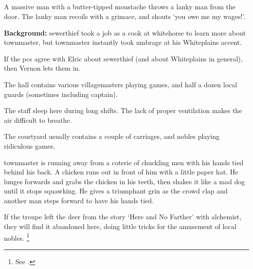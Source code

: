 \subsection{}
\label{whitehorse}

\begin{boxtext}

  A massive man with a butter-tipped moustache throws a lanky man from the door.
  The lanky man recoils with a grimace, and shouts `you owe me my wages!'.

\end{boxtext}

\textbf{Background:}
\Gls{sewerthief} took a job as a cook at \gls{whitehorse} to learn more about \gls{townmaster}, but \gls{townmaster} instantly took umbrage at his Whiteplains accent.

If the \glspl{pc} agree with Elric about \gls{sewerthief} (and about Whiteplains in general), then Vernon lets them in.


The hall contains various villagemasters playing games, and half a dozen local guards (sometimes including \gls{captain}).



The staff sleep here during long shifts.  The lack of proper ventilation makes the air difficult to breathe.


The courtyard usually contains a couple of carriages, and nobles playing ridiculous games.

\begin{boxtext}

  \Gls{townmaster} is running away from a coterie of chuckling men with his hands tied behind his back.
   A chicken runs out in front of him with a little paper hat.
   He lunges forwards and grabs the chicken in his teeth, then shakes it like a mad dog until it stops squawking.
   He gives a triumphant grin as the crowd clap and another man steps forward to have his hands tied.

\end{boxtext}

If the troupe left the deer from the story `Here and No Farther' with \gls{alchemist}, they will find it abandoned here, doing little tricks for the amusement of local nobles.
\footnote{See .}

